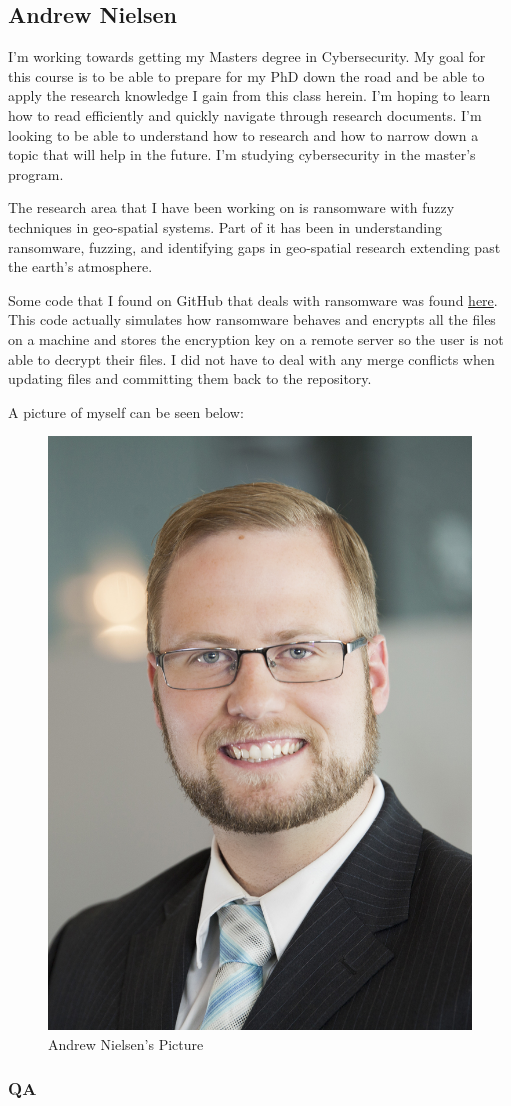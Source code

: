 \subsection{Andrew Nielsen}

I'm working towards getting my Masters degree in Cybersecurity. My goal for this course is to be able to prepare for my PhD down the road and be able to apply the research knowledge I gain from this class herein. I'm hoping to learn how to read efficiently and quickly navigate through research documents. I'm looking to be able to understand how to research and how to narrow down a topic that will help in the future. I'm studying cybersecurity in the master's program. 

The research area that I have been working on is ransomware with fuzzy techniques in geo-spatial systems. Part of it has been in understanding ransomware, fuzzing, and identifying gaps in geo-spatial research extending past the earth's atmosphere.

Some code that I found on GitHub that deals with ransomware was found \href{https://github.com/mauri870/ransomware.git}{here}. This code actually simulates how ransomware behaves and encrypts all the files on a machine and stores the encryption key on a remote server so the user is not able to decrypt their files. I did not have to deal with any merge conflicts when updating files and committing them back to the repository.


A picture of myself can be seen below:

\begin{figure}[htp]\centering
\includegraphics[width=.3\textwidth]{Andrew Professional picture.jpg}
\caption{Andrew Nielsen's Picture}
\label{fig:Andrew Professional picture}
\end{figure}

\subsubsection{QA}

